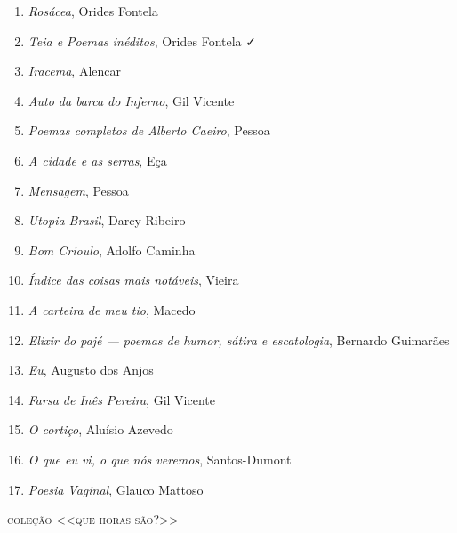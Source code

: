 \begin{enumerate}
\item \textit{Rosácea}, Orides Fontela
\item \textit{Teia e Poemas inéditos}, Orides Fontela ✓
\item \textit{Iracema}, Alencar
\item \textit{Auto da barca do Inferno}, Gil Vicente
\item \textit{Poemas completos de Alberto Caeiro}, Pessoa
\item \textit{A cidade e as serras}, Eça
\item \textit{Mensagem}, Pessoa
\item \textit{Utopia Brasil}, Darcy Ribeiro
\item \textit{Bom Crioulo}, Adolfo Caminha
\item \textit{Índice das coisas mais notáveis}, Vieira
\item \textit{A carteira de meu tio}, Macedo
\item \textit{Elixir do pajé --- poemas de humor, sátira e escatologia}, Bernardo Guimarães
\item \textit{Eu}, Augusto dos Anjos
\item \textit{Farsa de Inês Pereira}, Gil Vicente
\item \textit{O cortiço}, Aluísio Azevedo
\item \textit{O que eu vi, o que nós veremos}, Santos-Dumont
\item \textit{Poesia Vaginal}, Glauco Mattoso 
\end{enumerate}

\medskip
{\large\textsc{coleção <<que horas são?>>}}

